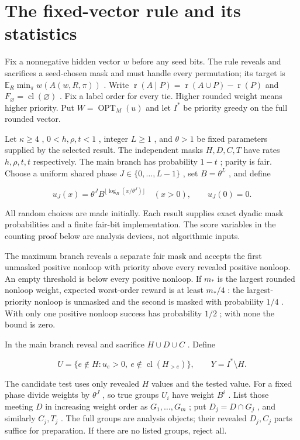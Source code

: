 \documentclass[11pt]{article}
\begin{document}
\section{The fixed-vector rule and its statistics}\label{the-fixed-vector-rule-and-its-statistics}

Fix a nonnegative hidden vector \(w\) before any seed bits. The rule reveals and sacrifices a seed-chosen mask and must handle every permutation; its target is \(\mathbb{E}_R\min_\pi w(A(w,R,\pi))\) . Write \(\operatorname{r}(A\mid P)=\operatorname{r}(A\cup P)-\operatorname{r}(P)\) and \(F_{\varnothing}=\operatorname{cl}(\varnothing)\) . Fix a label order for every tie. Higher rounded weight means higher priority. Put \(W=\operatorname{OPT}_M(u)\) and let \(I^*\) be priority greedy on the full rounded vector.

Let \(\kappa\ge4\) , \(0<h,\rho,t<1\) , integer \(L\ge1\) , and \(\theta>1\) be fixed parameters supplied by the selected result. The independent masks \(H,D,C,T\) have rates \(h,\rho,t,t\) respectively. The main branch has probability \(1-t\) ; parity is fair. Choose a uniform shared phase \(J\in\{0,\ldots,L-1\}\) , set \(B=\theta^L\) , and define

\[u_J(x)=\theta^J B^{\lfloor\log_B(x/\theta^J)\rfloor}\quad(x>0),\qquad u_J(0)=0.\]

All random choices are made initially. Each result supplies exact dyadic mask probabilities and a finite fair-bit implementation. The score variables in the counting proof below are analysis devices, not algorithmic inputs.

The maximum branch reveals a separate fair mask and accepts the first unmasked positive nonloop with priority above every revealed positive nonloop. An empty threshold is below every positive nonloop. If \(m_*\) is the largest rounded nonloop weight, expected worst-order reward is at least \(m_*/4\) : the largest-priority nonloop is unmasked and the second is masked with probability \(1/4\) . With only one positive nonloop success has probability \(1/2\) ; with none the bound is zero.

In the main branch reveal and sacrifice \(H\cup D\cup C\) . Define

\[U=\{e\notin H:u_e>0,\ e\notin\operatorname{cl}(H_{>e})\},\qquad Y=I^*\setminus H.\]

The candidate test uses only revealed \(H\) values and the tested value. For a fixed phase divide weights by \(\theta^J\) , so true groups \(U_i\) have weight \(B^i\) . List those meeting \(D\) in increasing weight order as \(G_1,\ldots,G_m\) ; put \(D_j=D\cap G_j\) , and similarly \(C_j,T_j\) . The full groups are analysis objects; their revealed \(D_j,C_j\) parts suffice for preparation. If there are no listed groups, reject all.
\end{document}
